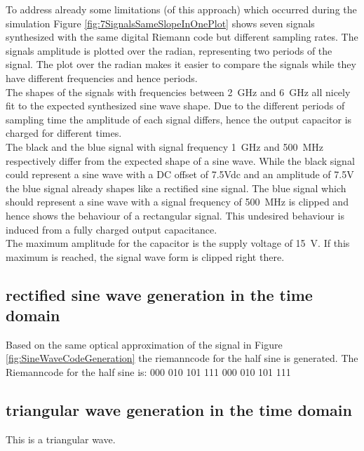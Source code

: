 To address already some limitations (of this approach) which occurred during the simulation Figure \ref{fig:7SignalsSameSlopeInOnePlot} shows seven signals synthesized with the same digital Riemann code but different sampling rates.
The signals amplitude is plotted over the radian, representing two periods of the signal.
The plot over the radian makes it easier to compare the signals while they have different frequencies and hence periods.\\
The shapes of the signals with frequencies between \SI{2}{\GHz} and \SI{6}{\GHz} all nicely fit to the expected synthesized sine wave shape. Due to the different periods of sampling time the amplitude of each signal differs, hence the output capacitor is charged for different times.\\
The black and the blue signal with signal frequency \SI{1}{\GHz} and  \SI{500}{\MHz} respectively differ from the expected shape of a sine wave. While the black signal could represent a sine wave with a DC offset of 7.5Vdc and an amplitude of 7.5V the blue signal already shapes like a rectified sine signal. The blue signal which should represent a sine wave with a signal frequency of \SI{500}{\MHz} is clipped and hence shows the behaviour of a rectangular signal. This undesired behaviour is induced from a fully charged output capacitance. \\
The maximum amplitude for the capacitor is the supply voltage of \SI{15}{\volt}. If this maximum is reached, the signal wave form is clipped right there.





\subsection{rectified sine wave generation in the time domain}
Based on the same optical approximation of the signal in Figure \ref{fig:SineWaveCodeGeneration} the riemanncode for the half sine is generated. The Riemanncode for the half sine is: 000 010 101 111 000 010 101 111
\subsection{triangular wave generation in the time domain}
This is a triangular wave.


